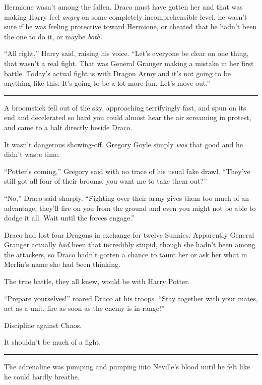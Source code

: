 Hermione wasn't among the fallen. Draco must have gotten her and that
was making Harry feel \emph{angry} on some completely incomprehensible
level, he wasn't sure if he was feeling protective toward Hermione, or
cheated that he hadn't been the one to do it, or maybe \emph{both.}

``All right,'' Harry said, raising his voice. ``Let's everyone be clear
on one thing, that wasn't a real fight. That was General Granger making
a mistake in her first battle. Today's actual fight is with Dragon Army
and it's not going to be anything like this. It's going to be a lot more
fun. Let's move out.''

\begin{center}\rule{3in}{0.4pt}\end{center}

A broomstick fell out of the sky, approaching terrifyingly fast, and
spun on its end and decelerated so hard you could almost hear the air
screaming in protest, and came to a halt directly beside Draco.

It wasn't dangerous showing-off. Gregory Goyle simply \emph{was} that
good and he didn't waste time.

``Potter's coming,'' Gregory said with no trace of his usual fake drawl.
``They've still got all four of their brooms, you want me to take them
out?''

``No,'' Draco said sharply. ``Fighting over their army gives them too
much of an advantage, they'll fire on you from the ground and even you
might not be able to dodge it all. Wait until the forces engage.''

Draco had lost four Dragons in exchange for twelve Sunnies. Apparently
General Granger actually \emph{had} been that incredibly stupid, though
she hadn't been among the attackers, so Draco hadn't gotten a chance to
taunt her or ask her what in Merlin's name she had been thinking.

The true battle, they all knew, would be with Harry Potter.

``Prepare yourselves!'' roared Draco at his troops. ``Stay together with
your mates, act as a unit, fire as soon as the enemy is in range!''

Discipline against Chaos.

It shouldn't be much of a fight.

\begin{center}\rule{3in}{0.4pt}\end{center}

The adrenaline was pumping and pumping into Neville's blood until he
felt like he could hardly breathe.


